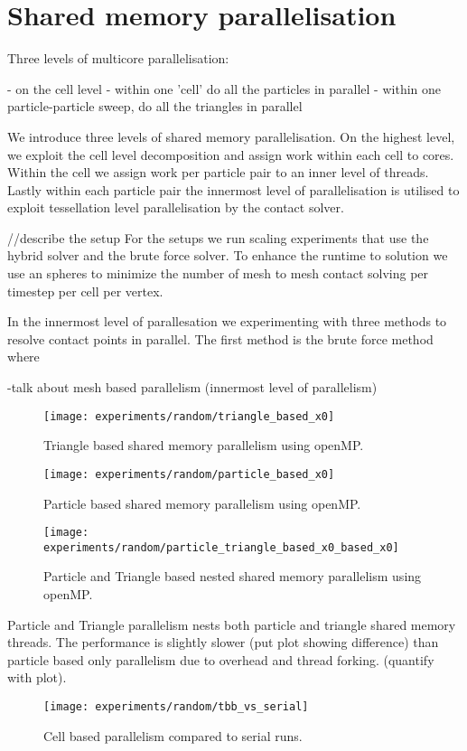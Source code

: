 \section{Shared memory parallelisation}
\label{section:shared-memory}

Three levels of multicore parallelisation:

- on the cell level
- within one 'cell' do all the particles in parallel
- within one particle-particle sweep, do all the triangles in parallel

We introduce three levels of shared memory parallelisation. On the highest level, we exploit the cell level decomposition and assign work within each cell to cores. Within the cell we assign work per particle pair  to an inner level of threads. Lastly within each particle pair the innermost level of parallelisation is utilised to exploit tessellation level parallelisation by the contact solver.

//describe the setup
For the setups we run scaling experiments that use the hybrid solver and the brute force solver. To enhance the runtime to solution we use an spheres to minimize the number of mesh to mesh contact solving per timestep per cell per vertex.
  

In the innermost level of parallesation we experimenting with three methods to resolve contact points in parallel. The first method is the brute force method where

-talk about mesh based parallelism (innermost level of parallelism)


\begin{figure}[!h]
\centering
\texttt{[image: experiments/random/triangle\_based\_x0]} \protect\caption{\label{fig17} Triangle based shared memory parallelism using openMP.}
\end{figure} 


\begin{figure}[!h]
\centering
\texttt{[image: experiments/random/particle\_based\_x0]} \protect\caption{\label{fig17}Particle based shared memory parallelism using openMP.}
\end{figure} 


\begin{figure}[!h]
\centering
\texttt{[image: experiments/random/particle\_triangle\_based\_x0\_based\_x0]} \protect\caption{\label{fig17}Particle and Triangle based nested shared memory parallelism using openMP.}
\end{figure} 

Particle and Triangle parallelism nests both particle and triangle shared memory threads. The performance is slightly slower (put plot showing difference) than particle based only parallelism due to overhead and thread forking. (quantify with plot).


\begin{figure}[!h]
\centering
\texttt{[image: experiments/random/tbb\_vs\_serial]} \protect\caption{\label{fig17}Cell based parallelism compared to serial runs.}
\end{figure} 


